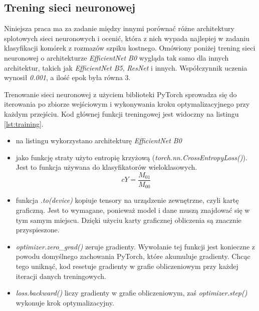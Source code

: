 \subsection{Trening sieci neuronowej}

Niniejsza praca ma za zadanie między innymi porównać różne architektury splotowych sieci neuronowych i ocenić,
która z nich wypada najlepiej w zadaniu klasyfikacji komórek z rozmazów szpiku kostnego.
Omówiony poniżej trening sieci neuronowej o architekturze \textit{EfficientNet B0} wygląda tak samo dla innych architektur, takich jak \textit{EfficientNet B5}, \textit{ResNet} i innych.
Współczynnik uczenia wynosił \textit{0.001}, a ilość epok była równa 3.

Trenowanie sieci neuronowej z użyciem biblioteki PyTorch sprowadza się do iterowania po zbiorze wejściowym i wykonywania kroku optymalizacyjnego przy każdym przejściu.
Kod głównej funkcji treningowej jest widoczny na listingu \ref{lst:training}.

\begin{itemize}
    \item na listingu wykorzystano architekturę \textit{EfficientNet B0}
    \item jako funkcję straty użyto entropię krzyżową (\textit{torch.nn.CrossEntropyLoss()}).
    Jest to funkcja używana do klasyfikatorów wieloklasowych.
    \begin{equation}
        cY = \dfrac{M_{01}}{M_{00}}\label{eq:crossentropy}
    \end{equation}
    \item funkcja \textit{.to(device)} kopiuje tensory na urządzenie zewnętrzne, czyli kartę graficzną.
    Jest to wymagane, ponieważ model i dane muszą znajdować się w tym samym miejscu.
    Dzięki użyciu karty graficznej obliczenia są znacznie przyspieszone.
    \item \textit{optimizer.zero\_grad()} zeruje gradienty.
    Wywołanie tej funkcji jest konieczne z powodu domyślnego zachowania PyTorch, które akumuluje gradienty.
    Chcąc tego uniknąć, kod resetuje gradienty w grafie obliczeniowym przy każdej iteracji danych treningowych.
    \item \textit{loss.backward()} liczy gradienty w grafie obliczeniowym, zaś \textit{optimizer.step()} wykonuje krok optymalizacyjny.
\end{itemize}
%
%

